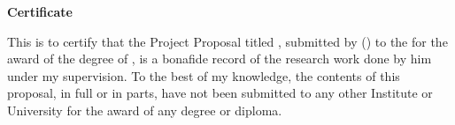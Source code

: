 \begin{flushright}
  \huge{\textbf{Certificate}}
\end{flushright}

\vspace{0.5cm}

This is to certify that the Project Proposal titled \ttitle{}, submitted by \authorname{} (\rn{}) to the \univname{} for the award of the degree of \degree{}, is a bonafide record of the research work done by him under my supervision. To the best of my knowledge, the contents of this proposal, in full or in parts, have not been submitted to any other Institute or University for the award of any degree or diploma.

\vspace{2cm}

\begin{flushright}
  \supname{}\\
  \suppost{}\\
  \supdeptname{}
\end{flushright}
